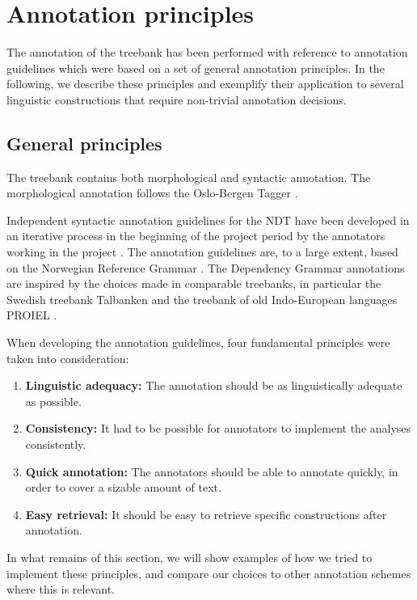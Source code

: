 \documentclass[10pt,a4paper]{article}
\begin{document}

\section{Annotation principles}
The annotation of the treebank has been performed with reference to
annotation guidelines which were based on a set of
general annotation principles. In the following, we describe these
principles and exemplify their application to several linguistic
constructions that require non-trivial annotation decisions.
\subsection{General principles}
The treebank contains both morphological and syntactic annotation. The morphological annotation follows the Oslo-Bergen Tagger \cite{Hag:Joh:Nok:00,Sol:2013}.

Independent syntactic annotation guidelines for the NDT have been
developed in an iterative process in the beginning of the project
period by the annotators working in the project
\cite{Kin:Sol:Eri:2013}. The annotation guidelines are, to a large
extent, based on the Norwegian Reference Grammar
\cite{Faa:Lie:Van:97}. The Dependency Grammar annotations are inspired
by the choices made in comparable treebanks, in particular the Swedish
treebank Talbanken \cite{Niv:Nil:Hal:2006} and the treebank of old
Indo-European languages PROIEL \cite{Hau:Joh:Eck:Wel:Her:Mut:2009}.

When developing the annotation guidelines, four fundamental principles were taken into consideration:
\begin{enumerate}
 \item \textbf{Linguistic adequacy:} The annotation should be as linguistically adequate as possible.
 \item \textbf{Consistency:} It had to be possible for annotators to implement the analyses consistently.
 \item \textbf{Quick annotation:} The annotators should be able to annotate quickly, in order to cover a sizable amount of text.
 \item \textbf{Easy retrieval:} It should be easy to retrieve specific constructions after annotation.
\end{enumerate}
In what remains of this section, we will show examples of how we tried to implement these principles, and compare our choices to other annotation schemes where this is relevant.
\end{document}
